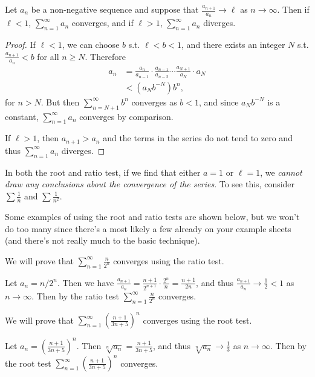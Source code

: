 \begin{theorem}
	Let $a_n$ be a non-negative sequence and suppose that $\frac{a_{n + 1}}{a_n} \rightarrow \ell$ as $n \rightarrow \infty$. Then if $\ell < 1$, $\sum_{n = 1}^{\infty} a_n$ converges, and if $\ell > 1$, $\sum_{n = 1}^{\infty} a_n$ diverges.
\end{theorem}
\begin{proof}
	If $\ell < 1$, we can choose $b$ s.t. $\ell < b < 1$, and there exists an integer $N$ s.t. $\frac{a_{n + 1}}{a_n} < b$ for all $n \geq N$. Therefore
	\begin{align*}
		a_n &= \frac{a_n}{a_{n - 1}} \cdot \frac{a_{n - 1}}{a_{n - 2}} \cdots \frac{a_{N + 1}}{a_{N}}\cdot a_N \\
		&< \left(a_N b^{-N}\right)b^{n},
	\end{align*}
	for $n > N$. But then $\sum_{n = N+1}^{\infty} b^n$ converges as $b < 1$, and since $a_N b^{-N}$ is a constant, $\sum_{n = 1}^{\infty} a_n$ converges by comparison.

	If $\ell > 1$, then $a_{n + 1} > a_n$ and the terms in the series do not tend to zero and thus $\sum_{n = 1}^{\infty} a_n$ diverges. 
\end{proof}
\begin{remark}
	In both the root and ratio test, if we find that either $a = 1$ or $\ell = 1$, we \emph{cannot draw any conclusions about the convergence of the series}. To see this, consider $\sum \frac{1}{n}$ and $\sum \frac{1}{n^2}$.
\end{remark}

Some examples of using the root and ratio tests are shown below, but we won't do too many since there's a most likely a few already on your example sheets (and there's not really much to the basic technique).

\begin{example}
	We will prove that $\sum_{n = 1}^{\infty} \frac{n}{2^n}$ converges using the ratio test.

	Let $a_n = n/2^n$. Then we have $\frac{a_{n + 1}}{a_n} = \frac{n + 1}{2^{n + 1}} \cdot \frac{2^n}{n} = \frac{n + 1}{2n}$, and thus $\frac{a_{n + 1}}{a_n} \rightarrow \frac{1}{2} < 1$ as $n \rightarrow \infty$. Then by the ratio test $\sum_{n = 1}^{\infty} \frac{n}{2^n}$ converges.
\end{example}

\begin{example}
	We will prove that $\sum_{n = 1}^{\infty} \left(\frac{n + 1}{3n + 5}\right)^n$ converges using the root test.

	Let $a_n = (\frac{n + 1}{3n + 5})^n$. Then $\sqrt[n]{a_n} = \frac{n + 1}{3n + 5}$, and thus $\sqrt[n]{a_n} \rightarrow \frac{1}{3}$ as $n \rightarrow \infty$. Then by the root test $\sum_{n = 1}^{\infty} \left(\frac{n + 1}{3n + 5}\right)^n$ converges.
\end{example}

